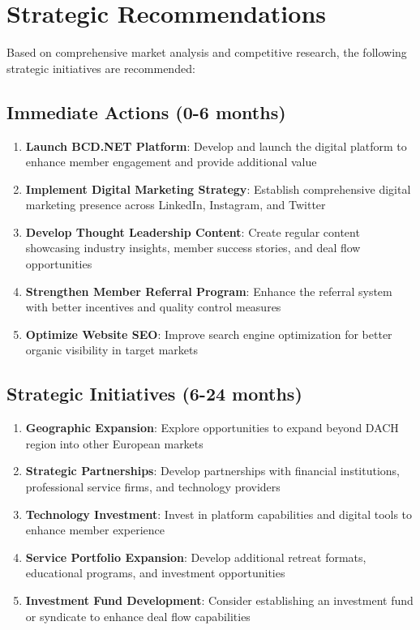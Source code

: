 \section{Strategic Recommendations}

Based on comprehensive market analysis and competitive research, the following strategic initiatives are recommended:

\subsection{Immediate Actions (0-6 months)}
\begin{enumerate}
    \item \textbf{Launch BCD.NET Platform}: Develop and launch the digital platform to enhance member engagement and provide additional value
    \item \textbf{Implement Digital Marketing Strategy}: Establish comprehensive digital marketing presence across LinkedIn, Instagram, and Twitter
    \item \textbf{Develop Thought Leadership Content}: Create regular content showcasing industry insights, member success stories, and deal flow opportunities
    \item \textbf{Strengthen Member Referral Program}: Enhance the referral system with better incentives and quality control measures
    \item \textbf{Optimize Website SEO}: Improve search engine optimization for better organic visibility in target markets
\end{enumerate}

\subsection{Strategic Initiatives (6-24 months)}
\begin{enumerate}
    \item \textbf{Geographic Expansion}: Explore opportunities to expand beyond DACH region into other European markets
    \item \textbf{Strategic Partnerships}: Develop partnerships with financial institutions, professional service firms, and technology providers
    \item \textbf{Technology Investment}: Invest in platform capabilities and digital tools to enhance member experience
    \item \textbf{Service Portfolio Expansion}: Develop additional retreat formats, educational programs, and investment opportunities
    \item \textbf{Investment Fund Development}: Consider establishing an investment fund or syndicate to enhance deal flow capabilities
\end{enumerate}

